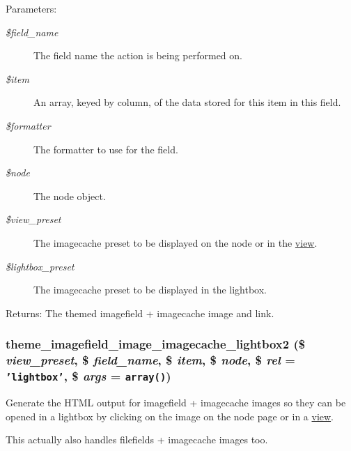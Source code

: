 \begin{Desc}
\item[Parameters:]
\begin{description}
\item[{\em \$field\_\-name}]The field name the action is being performed on. \item[{\em \$item}]An array, keyed by column, of the data stored for this item in this field. \item[{\em \$formatter}]The formatter to use for the field. \item[{\em \$node}]The node object. \item[{\em \$view\_\-preset}]The imagecache preset to be displayed on the node or in the \hyperlink{classview}{view}. \item[{\em \$lightbox\_\-preset}]The imagecache preset to be displayed in the lightbox. \end{description}
\end{Desc}
\begin{Desc}
\item[Returns:]The themed imagefield + imagecache image and link. \end{Desc}
\hypertarget{lightbox2_8formatter_8inc_8d796df1969b3548e0c86b5e6456c1bc}{
\subsubsection[{theme\_\-imagefield\_\-image\_\-imagecache\_\-lightbox2}]{\setlength{\rightskip}{0pt plus 5cm}theme\_\-imagefield\_\-image\_\-imagecache\_\-lightbox2 (\$ {\em view\_\-preset}, \/  \$ {\em field\_\-name}, \/  \$ {\em item}, \/  \$ {\em node}, \/  \$ {\em rel} = {\tt 'lightbox'}, \/  \$ {\em args} = {\tt array()})}}
\label{lightbox2_8formatter_8inc_8d796df1969b3548e0c86b5e6456c1bc}


Generate the HTML output for imagefield + imagecache images so they can be opened in a lightbox by clicking on the image on the node page or in a \hyperlink{classview}{view}.

This actually also handles filefields + imagecache images too.

